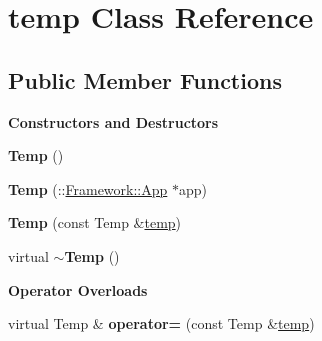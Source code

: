 \hypertarget{classtemp}{
\section{temp Class Reference}
\label{classtemp}
}
\subsection*{Public Member Functions}
\begin{Indent}{\bf Constructors and Destructors}\par
{\em \label{_amgrp64fb2b8a2107864a2f56d3f7cc47f3aa}
 }\begin{DoxyCompactItemize}
\item 
\hypertarget{classtemp_abda62d2e13e2f18c6982a73d96910d13}{
{\bfseries Temp} ()}
\label{classtemp_abda62d2e13e2f18c6982a73d96910d13}

\item 
\hypertarget{classtemp_a2c2403b42942cea5a2e2adc6a790b1da}{
{\bfseries Temp} (::\hyperlink{classFramework_1_1App}{Framework::App} $\ast$app)}
\label{classtemp_a2c2403b42942cea5a2e2adc6a790b1da}

\item 
\hypertarget{classtemp_a8e940ee90923974847786078c0f541df}{
{\bfseries Temp} (const Temp \&\hyperlink{classtemp}{temp})}
\label{classtemp_a8e940ee90923974847786078c0f541df}

\item 
\hypertarget{classtemp_a5941a5d51131d42b545f41fb936d0242}{
virtual {\bfseries $\sim$Temp} ()}
\label{classtemp_a5941a5d51131d42b545f41fb936d0242}

\end{DoxyCompactItemize}
\end{Indent}
\begin{Indent}{\bf Operator Overloads}\par
{\em \label{_amgrpffbf53248b2217a5cbc374d28018eed5}
 }\begin{DoxyCompactItemize}
\item 
\hypertarget{classtemp_a61ce2abe9859ebcf249f9f3635b72989}{
virtual Temp \& {\bfseries operator=} (const Temp \&\hyperlink{classtemp}{temp})}
\label{classtemp_a61ce2abe9859ebcf249f9f3635b72989}

\end{DoxyCompactItemize}
\end{Indent}
